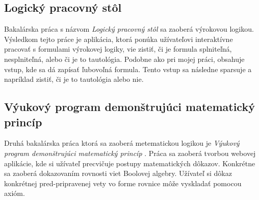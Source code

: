 \subsection{Logický pracovný stôl}
Bakalárska práca s názvom \emph{Logický pracovný stôl} \cite{lps} sa zaoberá výrokovou logikou. Výsledkom tejto práce je aplikácia, ktorá ponúka užívateľovi interaktívne pracovať s formulami výrokovej logiky, vie zistiť, či je formula splniteľná, nesplniteľná, alebo či je to tautológia. Podobne ako pri mojej práci, obsahuje vstup, kde sa dá zapísať ľubovoľná formula. Tento vstup sa následne sparsuje a napríklad zistiť, či je to tautológia alebo nie.

\subsection{Výukový program demonštrujúci matematický princíp}
Druhá bakalárska práca ktorá sa zaoberá metematickou logikou je \emph{Výukový program demonštrujúci matematický princíp} \cite{vpdmp}. Práca sa zaoberá tvorbou webovej aplikácie, kde si užívateľ precvičuje postupy matematických dôkazov. Konkrétne sa zaoberá dokazovaním rovnosti viet Boolovej algebry. Užívateľ si dôkaz konkrétnej pred-pripravenej vety vo forme rovnice môže vyskladať pomocou axióm. 
